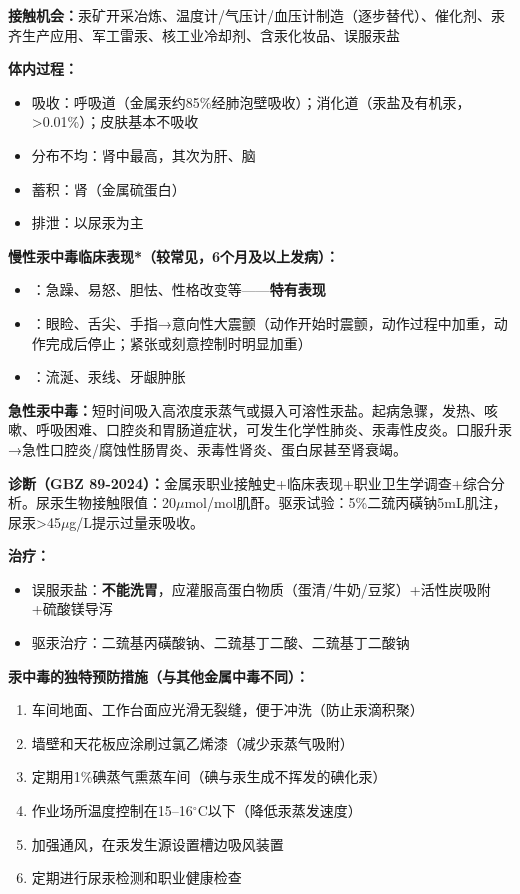 \begin{keybox}
\textbf{接触机会：}汞矿开采冶炼、温度计/气压计/血压计制造（逐步替代）、催化剂、汞齐生产应用、军工雷汞、核工业冷却剂、含汞化妆品、误服汞盐

\textbf{体内过程：}
\begin{itemize}[leftmargin=*]
    \item 吸收：呼吸道（金属汞约85\%经肺泡壁吸收）；消化道（汞盐及有机汞，>0.01\%）；皮肤基本不吸收
    \item 分布不均：肾中最高，其次为肝、脑
    \item 蓄积：肾（金属硫蛋白）
    \item 排泄：以尿汞为主
\end{itemize}

\textbf{慢性汞中毒临床表现*（较常见，6个月及以上发病）：}
\begin{itemize}[leftmargin=*]
    \item {}：急躁、易怒、胆怯、性格改变等——\textbf{特有表现}
    \item {}：眼睑、舌尖、手指→意向性大震颤（动作开始时震颤，动作过程中加重，动作完成后停止；紧张或刻意控制时明显加重）
    \item {}：流涎、汞线、牙龈肿胀
\end{itemize}

\textbf{急性汞中毒：}短时间吸入高浓度汞蒸气或摄入可溶性汞盐。起病急骤，发热、咳嗽、呼吸困难、口腔炎和胃肠道症状，可发生化学性肺炎、汞毒性皮炎。口服升汞→急性口腔炎/腐蚀性肠胃炎、汞毒性肾炎、蛋白尿甚至肾衰竭。

\textbf{诊断（GBZ 89-2024）：}金属汞职业接触史+临床表现+职业卫生学调查+综合分析。尿汞生物接触限值：20$\mu$mol/mol肌酐。驱汞试验：5\%二巯丙磺钠5mL肌注，尿汞>45$\mu$g/L提示过量汞吸收。

\textbf{治疗：}
\begin{itemize}[leftmargin=*]
    \item 误服汞盐：\textbf{不能洗胃}，应灌服高蛋白物质（蛋清/牛奶/豆浆）+活性炭吸附+硫酸镁导泻
    \item 驱汞治疗：二巯基丙磺酸钠、二巯基丁二酸、二巯基丁二酸钠
\end{itemize}

\textbf{汞中毒的独特预防措施（与其他金属中毒不同）：}
\begin{enumerate}[leftmargin=*]
    \item 车间地面、工作台面应光滑无裂缝，便于冲洗（防止汞滴积聚）
    \item 墙壁和天花板应涂刷过氯乙烯漆（减少汞蒸气吸附）
    \item 定期用1\%碘蒸气熏蒸车间（碘与汞生成不挥发的碘化汞）
    \item 作业场所温度控制在15--16$^\circ$C以下（降低汞蒸发速度）
    \item 加强通风，在汞发生源设置槽边吸风装置
    \item 定期进行尿汞检测和职业健康检查
\end{enumerate}
\end{keybox}

